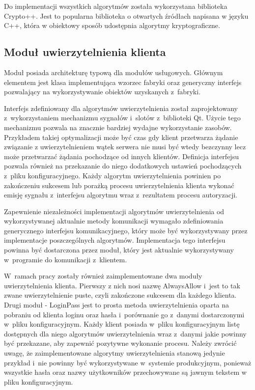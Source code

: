 Do implementacji wszystkich algorytmów została wykorzystana biblioteka
Crypto++. Jest to popularna biblioteka o otwartych źródłach napisana w
języku C++, która w obiektowy sposób udostępnia algorytmy
kryptograficzne.

\subsection[Moduł uwierzytelnienia][Moduł uwierzytelnienia klienta]{Moduł uwierzytelnienia klienta}

Moduł posiada architekturę typową dla modułów usługowych. Głównym
elementem jest klasa implementująca wzorzec fabryki oraz generyczny
interfejs pozwalający na wykorzystywanie obiektów uzyskanych
z~fabryki.

Interfejs zdefiniowany dla algorytmów uwierzytelnienia został
zaprojektowany z~wykorzystaniem mechanizmu sygnałów i~slotów
z~biblioteki Qt. Użycie tego mechanizmu pozwala na znacznie bardziej
wydajne wykorzystanie zasobów. Przykładem takiej optymalizacji może być
czas gdy klient przetwarza żądanie związanie z uwierzytelnieniem wątek
serwera nie musi być wtedy bezczynny lecz może przetwarzać żądania
pochodzące od innych klientów. Definicja interfejsu pozwala również na
przekazanie do niego dodatkowych ustawień pochodzących z~pliku
konfiguracyjnego. Każdy algorytm uwierzytelnienia powinien po
zakończeniu sukcesem lub porażką procesu uwierzytelnienia klienta
wykonać emisję sygnału z~interfejsu algorytmu wraz z~rezultatem
procesu autoryzacji.

Zapewnienie niezależności implementacji algorytmów uwierzytelnienia od
wykorzystywanej aktualnie metody komunikacji wymagało zdefiniowania
generycznego interfejsu komunikacyjnego, który może być wykorzystywany
przez implementacje poszczególnych algorytmów. Implementacja tego
interfejsu powinna być dostarczona przez moduł, który jest aktualnie
wykorzystywany w~programie do komunikacji z~klientem.

W~ramach pracy zostały również zaimplementowane dwa moduły
uwierzytelnienia klienta. Pierwszy z nich nosi nazwę AlwaysAllow
i~jest to tak zwane uwierzytelnienie puste, czyli zakończone sukcesem
dla każdego klienta. Drugi moduł - LoginPass jest to prosta metoda
uwierzytelnienia oparta na pobraniu od klienta loginu oraz hasła
i~porównanie go z~danymi dostarczonymi w~pliku konfiguracyjnym. Każdy
klient posiada w~pliku konfiguracyjnym listę dostępnych dla niego
algorytmów uwierzytelnienia wraz z~danymi jakie powinny być
przekazane, aby zapewnić pozytywne wykonanie procesu. Należy zwrócić
uwagę, że zaimplementowane algorytmy uwierzytelnienia stanową jedynie
przykład i~nie powinny być wykorzystywane w~systemie produkcyjnym,
ponieważ wszystkie hasła oraz nazwy użytkowników przechowywane są
jawnym tekstem w pliku konfiguracyjnym.

